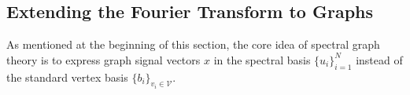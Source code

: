 \subsection{Extending the Fourier Transform to Graphs}%
\label{sec:sgt:fourier}

As mentioned at the beginning of this section, the core idea of spectral graph theory is to express graph signal vectors $x$ in the spectral basis ${\{ u_i \}}_{i = 1}^{N}$ instead of the standard vertex basis ${\{ b_i \}}_{v_i \in \mathcal{V}}$.
